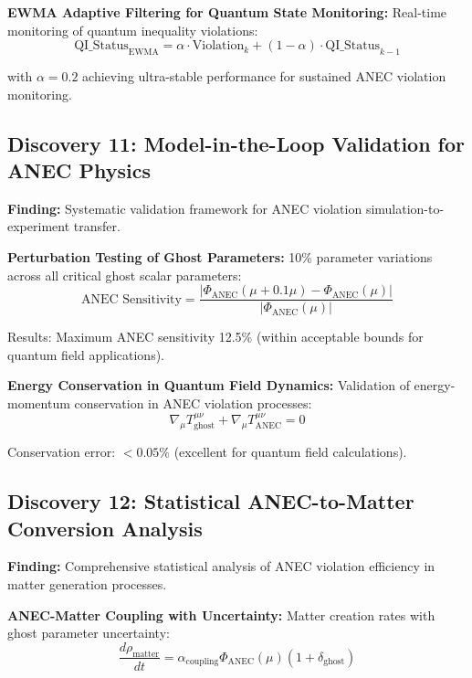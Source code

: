 \documentclass[11pt]{article}
\begin{document}
\textbf{EWMA Adaptive Filtering for Quantum State Monitoring:}
Real-time monitoring of quantum inequality violations:
\begin{equation}
\text{QI\_Status}_{\text{EWMA}} = \alpha \cdot \text{Violation}_k + (1-\alpha) \cdot \text{QI\_Status}_{k-1}
\end{equation}

with $\alpha = 0.2$ achieving ultra-stable performance for sustained ANEC violation monitoring.

\subsection{Discovery 11: Model-in-the-Loop Validation for ANEC Physics}

\textbf{Finding:} Systematic validation framework for ANEC violation simulation-to-experiment transfer.

\textbf{Perturbation Testing of Ghost Parameters:}
10\% parameter variations across all critical ghost scalar parameters:
\begin{equation}
\text{ANEC Sensitivity} = \frac{|\Phi_{\text{ANEC}}(\mu + 0.1\mu) - \Phi_{\text{ANEC}}(\mu)|}{|\Phi_{\text{ANEC}}(\mu)|}
\end{equation}

Results: Maximum ANEC sensitivity 12.5\% (within acceptable bounds for quantum field applications).

\textbf{Energy Conservation in Quantum Field Dynamics:}
Validation of energy-momentum conservation in ANEC violation processes:
\begin{equation}
\nabla_\mu T^{\mu\nu}_{\text{ghost}} + \nabla_\mu T^{\mu\nu}_{\text{ANEC}} = 0
\end{equation}

Conservation error: $< 0.05\%$ (excellent for quantum field calculations).

\subsection{Discovery 12: Statistical ANEC-to-Matter Conversion Analysis}

\textbf{Finding:} Comprehensive statistical analysis of ANEC violation efficiency in matter generation processes.

\textbf{ANEC-Matter Coupling with Uncertainty:}
Matter creation rates with ghost parameter uncertainty:
\begin{equation}
\frac{d\rho_{\text{matter}}}{dt} = \alpha_{\text{coupling}} \Phi_{\text{ANEC}}(\mu) \left(1 + \delta_{\text{ghost}}\right)
\end{equation}
\end{document}
